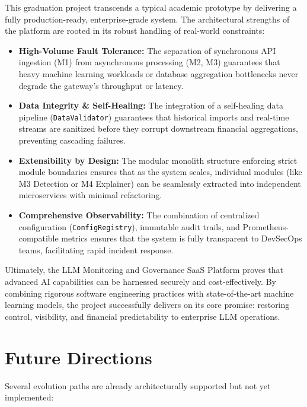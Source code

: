 \documentclass[12pt,a4paper,twoside]{report}
\begin{document}
This graduation project transcends a typical academic prototype by delivering a fully production-ready, enterprise-grade system. The architectural strengths of the platform are rooted in its robust handling of real-world constraints:

\begin{itemize}
  \item \textbf{High-Volume Fault Tolerance:} The separation of synchronous API ingestion (M1) from asynchronous processing (M2, M3) guarantees that heavy machine learning workloads or database aggregation bottlenecks never degrade the gateway's throughput or latency. 
  \item \textbf{Data Integrity \& Self-Healing:} The integration of a self-healing data pipeline (\texttt{DataValidator}) guarantees that historical imports and real-time streams are sanitized before they corrupt downstream financial aggregations, preventing cascading failures.
  \item \textbf{Extensibility by Design:} The modular monolith structure enforcing strict module boundaries ensures that as the system scales, individual modules (like M3 Detection or M4 Explainer) can be seamlessly extracted into independent microservices with minimal refactoring.
  \item \textbf{Comprehensive Observability:} The combination of centralized configuration (\texttt{ConfigRegistry}), immutable audit trails, and Prometheus-compatible metrics ensures that the system is fully transparent to DevSecOps teams, facilitating rapid incident response.
\end{itemize}

Ultimately, the LLM Monitoring and Governance SaaS Platform proves that advanced AI capabilities can be harnessed securely and cost-effectively. By combining rigorous software engineering practices with state-of-the-art machine learning models, the project successfully delivers on its core promise: restoring control, visibility, and financial predictability to enterprise LLM operations.

\section{Future Directions}
\label{sec:future-directions}

Several evolution paths are already architecturally supported but not yet implemented:
\end{document}

